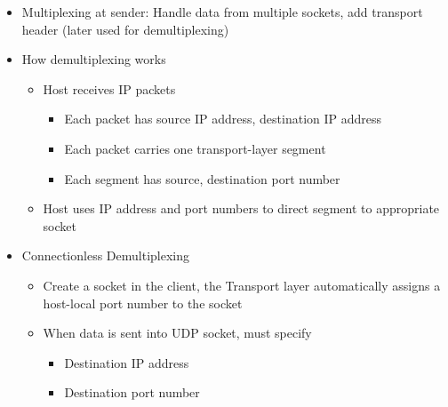 \begin{itemize}
    \begin{itemize}

      \item Multiplexing at sender: Handle data from multiple sockets, add transport header (later used for demultiplexing)

      \item How demultiplexing works

        \begin{itemize}

          \item Host receives IP packets

            \begin{itemize}

              \item Each packet has source IP address, destination IP address

              \item Each packet carries one transport-layer segment

              \item Each segment has source, destination port number

            \end{itemize}

          \item Host uses IP address and port numbers to direct segment to appropriate socket

        \end{itemize}

      \item Connectionless Demultiplexing

        \begin{itemize}

          \item Create a socket in the client, the Transport layer automatically assigns a host-local port number to the socket

          \item When data is sent into UDP socket, must specify

            \begin{itemize}
                
              \item Destination IP address
                
              \item Destination port number

            \end{itemize}


\end{itemize}
\end{itemize}
\end{itemize}

